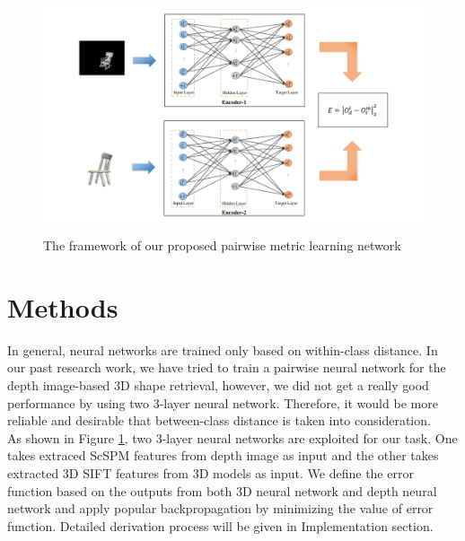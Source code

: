 \documentclass{article}
\begin{document}
\begin{figure}[t]
	
	\centering
	\includegraphics[height=7cm, width=12cm]{figure.pdf}
	\caption{The framework of our proposed pairwise metric learning network}
	\label{figure1}
\end{figure}



\section{Methods}
In general, neural networks are trained only based on within-class distance. In our past research work, we have tried to train a pairwise neural network for the depth image-based 3D shape retrieval, however, we did not get a really good performance by using two 3-layer neural network. Therefore, it would be more reliable and desirable that between-class distance is taken into consideration. \\

As shown in Figure \ref{figure1}, two 3-layer neural networks are exploited for our task. One takes extraced ScSPM features from depth image as input and the other takes extracted 3D SIFT features from 3D models as input. We define the error function based on the outputs from both 3D neural network and depth neural network and apply popular backpropagation by minimizing the value of error function. Detailed derivation process will be given in Implementation section.\\


\end{document}
